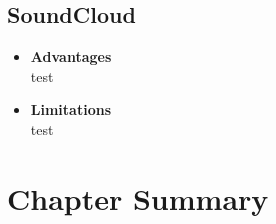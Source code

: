 \subsection{SoundCloud}

\begin{itemize}[\label{}]
    \item \textbf{Advantages} \\
    test

    \item \textbf{Limitations} \\
    test
\end{itemize}

\section{Chapter Summary}